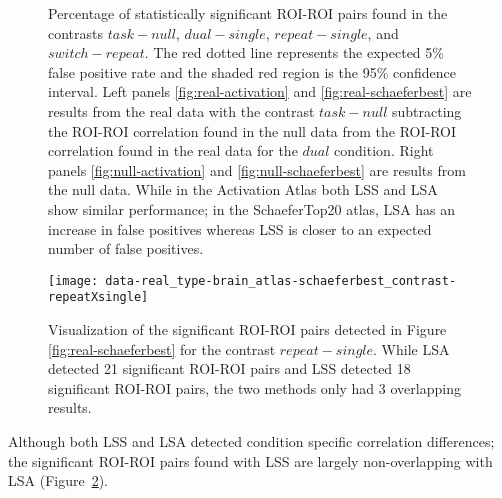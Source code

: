 \documentclass[phd,appendix,figures]{uithesis}
\begin{document}
\begin{figure}[H]
  \centering
  \hfill
  \vfill
  \hfill
  \caption{
    Percentage of statistically significant ROI-ROI pairs found
    in the contrasts $task - null$, $dual - single$, $repeat - single$, and
    $switch - repeat$.
    The red dotted line represents the expected 5\% false positive rate
    and the shaded red region is the 95\% confidence interval.
    Left panels \ref{fig:real-activation} and \ref{fig:real-schaeferbest}
    are results from the real data with the contrast $task - null$ subtracting the
    ROI-ROI correlation found in the null data from the ROI-ROI correlation found in the
    real data for the $dual$ condition.
    Right panels \ref{fig:null-activation} and \ref{fig:null-schaeferbest} are results
    from the null data.
    While in the Activation Atlas both LSS and LSA show similar performance;
    in the SchaeferTop20 atlas, LSA has an increase in false positives
    whereas LSS is closer to an expected number of false positives.
  }
\label{fig:main-result}
\end{figure}

\begin{figure}[H]
  \centering
  \texttt{[image: 
    data-real\_type-brain\_atlas-schaeferbest\_contrast-repeatXsingle]}
  \caption{
    Visualization of the significant ROI-ROI pairs detected in Figure \ref{fig:real-schaeferbest}
    for the contrast $repeat - single$.
    While LSA detected 21 significant ROI-ROI pairs and LSS detected 18 significant
    ROI-ROI pairs, the two methods only had 3 overlapping results.
  }
\label{fig:non-overlap}
\end{figure}

Although both LSS and LSA detected condition specific correlation differences;
the significant ROI-ROI pairs found with LSS are largely non-overlapping with LSA (Figure~\ref{fig:non-overlap}).
\end{document}
